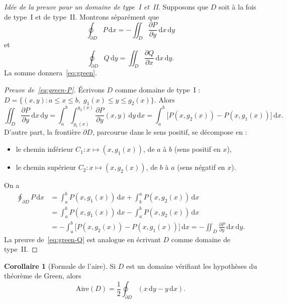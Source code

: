 \documentclass[12pt,a4paper,openany]{book}
\theoremstyle{definition}
\newtheorem{corollaire}{Corollaire}[chapter]
\newcommand{\dd}{\mathrm{d}}
\begin{document}
\begin{proof}[Idée de la preuve pour un domaine de type~I et~II]
  Supposons que $D$ soit à la fois de type~I et de type~II. Montrons
  séparément que
  \begin{equation}\label{eq:green-P}
    \oint_{\partial D}P\,\dd x = -\iint_D \frac{\partial P}{\partial y}
    \,\dd x\,\dd y
  \end{equation}
  et
  \begin{equation}\label{eq:green-Q}
    \oint_{\partial D}Q\,\dd y = \iint_D \frac{\partial Q}{\partial x}
    \,\dd x\,\dd y.
  \end{equation}
  La somme donnera~\eqref{eq:green}.

  \emph{Preuve de~\eqref{eq:green-P}.} Écrivons $D$ comme domaine de
  type~I : $D = \{(x,y) : a \leqslant x \leqslant b,\;
  g_1(x) \leqslant y \leqslant g_2(x)\}$. Alors
  \[
    \iint_D \frac{\partial P}{\partial y}\,\dd x\,\dd y
    = \int_a^b\!\int_{g_1(x)}^{g_2(x)} \frac{\partial P}{\partial y}
    (x,y)\,\dd y\,\dd x
    = \int_a^b \bigl[P(x,g_2(x)) - P(x,g_1(x))\bigr]\,\dd x.
  \]
  D'autre part, la frontière $\partial D$, parcourue dans le sens
  positif, se décompose en :
  \begin{itemize}[nosep]
    \item le chemin inférieur $C_1\colon x \mapsto (x, g_1(x))$, de $a$
      à $b$ (sens positif en $x$),
    \item le chemin supérieur $C_2\colon x \mapsto (x, g_2(x))$, de $b$
      à $a$ (sens négatif en $x$).
  \end{itemize}
  On a
  \begin{align*}
    \oint_{\partial D}P\,\dd x
    &= \int_a^b P(x,g_1(x))\,\dd x + \int_b^a P(x,g_2(x))\,\dd x \\
    &= \int_a^b P(x,g_1(x))\,\dd x - \int_a^b P(x,g_2(x))\,\dd x \\
    &= -\int_a^b \bigl[P(x,g_2(x))-P(x,g_1(x))\bigr]\,\dd x
    = -\iint_D\frac{\partial P}{\partial y}\,\dd x\,\dd y.
  \end{align*}
  La preuve de~\eqref{eq:green-Q} est analogue en écrivant $D$ comme
  domaine de type~II.
\end{proof}

\begin{corollaire}[Formule de l'aire]\label{cor:aire-green}
  Si $D$ est un domaine vérifiant les hypothèses du théorème de Green,
  alors
  \begin{equation}\label{eq:aire-green}
    \text{Aire}(D) = \frac{1}{2}\oint_{\partial D}(x\,\dd y - y\,\dd x).
  \end{equation}
\end{corollaire}
\end{document}
